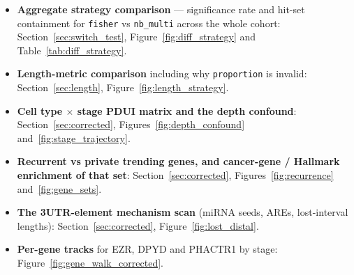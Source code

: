 \begin{itemize}[nosep]
  \item \textbf{Aggregate strategy comparison} --- significance rate and hit-set
    containment for \texttt{fisher} vs \texttt{nb\_multi} across the whole
    cohort: Section~\ref{sec:switch_test}, Figure~\ref{fig:diff_strategy} and
    Table~\ref{tab:diff_strategy}.
  \item \textbf{Length-metric comparison} including why \texttt{proportion} is
    invalid: Section~\ref{sec:length}, Figure~\ref{fig:length_strategy}.
  \item \textbf{Cell type $\times$ stage PDUI matrix and the depth confound}:
    Section~\ref{sec:corrected}, Figures~\ref{fig:depth_confound}
    and~\ref{fig:stage_trajectory}.
  \item \textbf{Recurrent vs private trending genes, and cancer-gene /
    Hallmark enrichment of that set}: Section~\ref{sec:corrected},
    Figures~\ref{fig:recurrence} and~\ref{fig:gene_sets}.
  \item \textbf{The 3\textquotesingle{}UTR-element mechanism scan}
    (miRNA seeds, AREs, lost-interval lengths):
    Section~\ref{sec:corrected}, Figure~\ref{fig:lost_distal}.
  \item \textbf{Per-gene tracks} for EZR, DPYD and PHACTR1 by stage:
    Figure~\ref{fig:gene_walk_corrected}.
\end{itemize}
